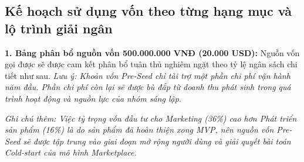 \subsection{Kế hoạch sử dụng vốn theo từng hạng mục và lộ trình giải ngân}

\textbf{1. Bảng phân bổ nguồn vốn 500.000.000 VNĐ (20.000 USD):}
Nguồn vốn gọi được sẽ được cam kết phân bổ tuân thủ nghiêm ngặt theo tỷ lệ ngân sách chi tiết như sau.
\textit{Lưu ý: Khoản vốn Pre-Seed chỉ tài trợ một phần chi phí vận hành năm đầu. Phần chi phí còn lại sẽ được bù đắp từ doanh thu phát sinh trong quá trình hoạt động và nguồn lực của nhóm sáng lập.}

\begin{table}[htbp]
    \centering
    \caption{Phân bổ chi tiết nguồn vốn gọi được (vòng Pre-Seed)}
\end{table}

\textit{Ghi chú thêm: Việc tỷ trọng vốn đầu tư cho Marketing (36\%) cao hơn Phát triển sản phẩm (16\%) là do sản phẩm đã hoàn thiện xong MVP, nên nguồn vốn Pre-Seed sẽ được tập trung vào giai đoạn mở rộng người dùng và giải quyết bài toán Cold-start của mô hình Marketplace.}

